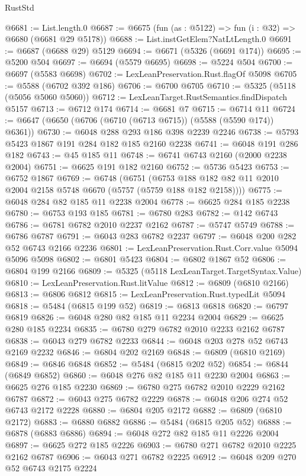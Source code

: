 \begin{lexlean}{RustStd}
\begin{coremodule}
{\begin{coremodule}
{{{{{{{{{{{{{{{{{{{{{{{{{{{{{{{@6681 := List.length.{0}
@6687 := @6675 (fun (as : @5122) => fun (i : @32) => @6680 (@6681 @29 @5178))
@6688 := List.instGetElem?NatLtLength.{0}
@6691 := @6687 (@6688 @29) @5129
@6694 := @6671 (@5326 (@6691 @174))
@6695 := @5200 @504
@6697 := @6694 (@5579 @6695)
@6698 := @5224 @504
@6700 := @6697 (@5583 @6698)
@6702 := LexLeanPreservation.Rust.flagOf @5098
@6705 := @5588 (@6702 @392 @186)
@6706 := @6700 @6705
@6710 := @5325 (@5118 (@5056 @5060 @5060))
@6712 := LexLeanTarget.RustSemantics.findDispatch @5157
@6713 := @6712 @174
@6714 := @6681 @7
@6715 := @6714 @11
@6724 := @6647 (@6650 (@6706 (@6710 (@6713 @6715)) (@5588 (@5590 @174)) @6361))
@6730 := @6048 @288 @293 @186 @398 @2239 @2246
@6738 := @5793 @5423 @1867 @191 @284 @182 @185 @2160 @2238
@6741 := @6048 @191 @286 @182
@6743 := @45 @185 @11
@6748 := @6741 @6743 @2160 (@2000 @2238 @2004)
@6751 := @6625 @191 @182 @2160
@6752 := @5736 @5423
@6753 := @6752 @1867
@6769 := @6748
    (@6751 (@6753 @188 @182 @82 @11 @2010 @2004 @2158 @5748 @6670 (@5757 (@5759 @188 @182 @2158))))
@6775 := @6048 @284 @82 @185 @11 @2238 @2004
@6778 := @6625 @284 @185 @2238
@6780 := @6753 @193 @185
@6781 := @6780 @283
@6782 := @142 @6743
@6786 := @6781 @6782 @2010 @2237 @2162
@6787 := @5747 @5749
@6788 := @6786 @6787
@6791 := @6043 @283 @6782 @2237
@6797 := @6048 @200 @282 @52 @6743 @2166 @2236
@6801 := LexLeanPreservation.Rust.Corr.value @5094 @5096 @5098
@6802 := @6801 @5423
@6804 := @6802 @1867 @52
@6806 := @6804 @199 @2166
@6809 := @5325 (@5118 LexLeanTarget.TargetSyntax.Value)
@6810 := LexLeanPreservation.Rust.litValue
@6812 := @6809 (@6810 @2166)
@6813 := @6806 @6812
@6815 := LexLeanPreservation.Rust.typedLit @5094
@6818 := @5484 (@6815 @199 @52)
@6819 := @6813 @6818
@6820 := @6797 @6819
@6826 := @6048 @280 @82 @185 @11 @2234 @2004
@6829 := @6625 @280 @185 @2234
@6835 := @6780 @279 @6782 @2010 @2233 @2162 @6787
@6838 := @6043 @279 @6782 @2233
@6844 := @6048 @203 @278 @52 @6743 @2169 @2232
@6846 := @6804 @202 @2169
@6848 := @6809 (@6810 @2169)
@6849 := @6846 @6848
@6852 := @5484 (@6815 @202 @52)
@6854 := @6844 (@6849 @6852)
@6860 := @6048 @276 @82 @185 @11 @2230 @2004
@6863 := @6625 @276 @185 @2230
@6869 := @6780 @275 @6782 @2010 @2229 @2162 @6787
@6872 := @6043 @275 @6782 @2229
@6878 := @6048 @206 @274 @52 @6743 @2172 @2228
@6880 := @6804 @205 @2172
@6882 := @6809 (@6810 @2172)
@6883 := @6880 @6882
@6886 := @5484 (@6815 @205 @52)
@6888 := @6878 (@6883 @6886)
@6894 := @6048 @272 @82 @185 @11 @2226 @2004
@6897 := @6625 @272 @185 @2226
@6903 := @6780 @271 @6782 @2010 @2225 @2162 @6787
@6906 := @6043 @271 @6782 @2225
@6912 := @6048 @209 @270 @52 @6743 @2175 @2224
}}}}}}}}}}}}}}}}}}}}}}}}}}}}}}}
\end{coremodule}}
\end{coremodule}
\end{lexlean}
